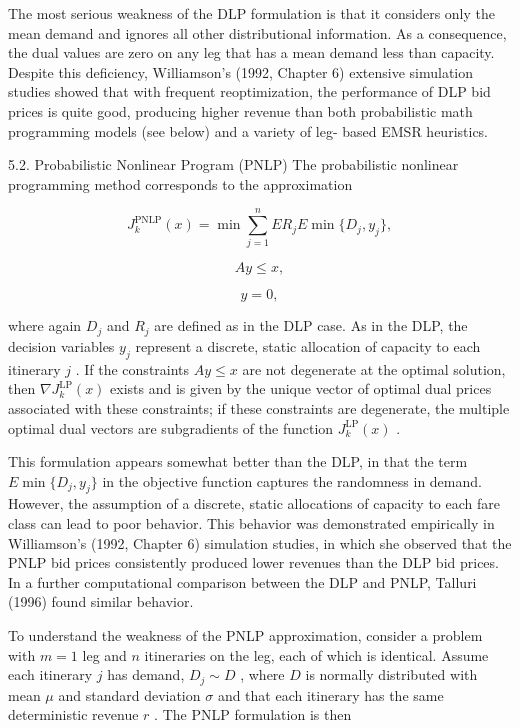The most serious weakness of the DLP formulation is that it considers
only the mean demand and ignores all other distributional information.
As a consequence, the dual values are zero on any leg that has a mean
demand less than capacity. Despite this deficiency, Williamson's (1992,
Chapter 6) extensive simulation studies showed that with frequent
reoptimization, the performance of DLP bid prices is quite good,
producing higher revenue than both probabilistic math programming models
(see below) and a variety of leg- based EMSR heuristics.

5.2. Probabilistic Nonlinear Program (PNLP) The probabilistic nonlinear
programming method corresponds to the approximation

\[
J_{k}^{\mathrm{PNLP}}(x) = \min \sum_{j = 1}^{n}E R_{j}E\min \{D_{j},y_{j}\} ,
\]

\[
A y\leq x,
\]

\[
y = 0,
\]

where again \(D_{j}\) and \(R_{j}\) are defined as in the DLP case. As
in the DLP, the decision variables \(y_{j}\) represent a discrete,
static allocation of capacity to each itinerary \(j\) . If the
constraints \(A y \leq x\) are not degenerate at the optimal solution,
then \(\nabla J_{k}^{\mathrm{LP}}(x)\) exists and is given by the unique
vector of optimal dual prices associated with these constraints; if
these constraints are degenerate, the multiple optimal dual vectors are
subgradients of the function \(J_{k}^{\mathrm{LP}}(x)\) .

This formulation appears somewhat better than the DLP, in that the term
\(E \min \{D_{j}, y_{j}\}\) in the objective function captures the
randomness in demand. However, the assumption of a discrete, static
allocations of capacity to each fare class can lead to poor behavior.
This behavior was demonstrated empirically in Williamson's (1992,
Chapter 6) simulation studies, in which she observed that the PNLP bid
prices consistently produced lower revenues than the DLP bid prices. In
a further computational comparison between the DLP and PNLP, Talluri
(1996) found similar behavior.

To understand the weakness of the PNLP approximation, consider a problem
with \(m = 1\) leg and \(n\) itineraries on the leg, each of which is
identical. Assume each itinerary \(j\) has demand, \(D_{j} \sim D\) ,
where \(D\) is normally distributed with mean \(\mu\) and standard
deviation \(\sigma\) and that each itinerary has the same deterministic
revenue \(r\) . The PNLP formulation is then

